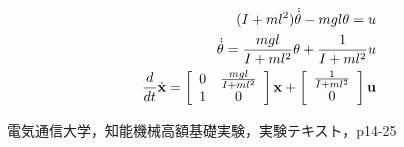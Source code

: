 \documentclass[twocolumn, 10pt,a4j]{jsarticle}
\begin{document}
\begin{enumerate}
        \begin{eqnarray}
          (I + ml^{2})\dot{\dot{\theta}} - mgl \theta = u \\
          \dot{\dot{\theta}} = \frac{mgl}{I + ml^{2}}\theta + \frac{1}{I + ml^{2}}u \\
          \frac{d}{dt}\dot{\bf{x}} = \left[
                                        \begin{array}{cc}
                                          0 & \frac{mgl}{I+ml^{2}} \\
                                          1 & 0
                                        \end{array}
                                      \right] \bf{x} + \left[
                                                        \begin{array}{c}
                                                          \frac{1}{I+ml^{2}} \\
                                                          0
                                                        \end{array}
                                                      \right]u
        \end{eqnarray}

    \end{enumerate}


\begin{thebibliography}{3}
\bibitem{}電気通信大学，知能機械高額基礎実験，実験テキスト，p14-25
\end{thebibliography}
\end{document}
